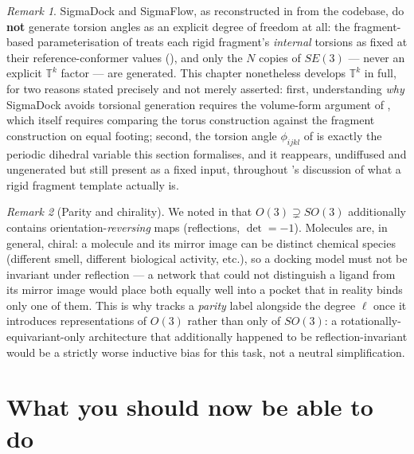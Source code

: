 \documentclass[11pt,a4paper]{report}
\theoremstyle{definition}
\theoremstyle{remark}
\newtheorem{remark}[remark]{Remark}
\begin{document}
\begin{remark}
\label{rem:torus-not-used}
SigmaDock and SigmaFlow, as reconstructed in
 from the codebase, do \textbf{not}
generate torsion angles as an explicit degree of freedom at all: the
fragment-based parameterisation of  treats
each rigid fragment's \emph{internal} torsions as fixed at their reference-conformer
values (), and only the $N$ copies of
$SE(3)$ --- never an explicit $\mathbb T^k$ factor --- are generated. This
chapter nonetheless develops $\mathbb T^k$ in full, for two reasons stated
precisely and not merely asserted: first, understanding \emph{why}
SigmaDock avoids torsional generation requires the volume-form argument of
, which itself requires comparing the torus
construction against the fragment construction on equal footing; second,
the torsion angle $\phi_{ijkl}$ of  is exactly the
periodic dihedral variable this section formalises, and it reappears,
undiffused and ungenerated but still present as a fixed input, throughout
's discussion of what a rigid fragment
template actually is.
\end{remark}

\begin{remark}[Parity and chirality]
\label{rem:parity-scratch}
We noted in  that $O(3)\supsetneq SO(3)$ additionally
contains orientation-\emph{reversing} maps (reflections, $\det=-1$).
Molecules are, in general, chiral: a molecule and its mirror image can be
distinct chemical species (different smell, different biological activity,
etc.), so a docking model must not be invariant under reflection --- a
network that could not distinguish a ligand from its mirror image would
place both equally well into a pocket that in reality binds only one of
them. This is why  tracks a \emph{parity} label
alongside the degree $\ell$ once it introduces representations of $O(3)$
rather than only of $SO(3)$: a rotationally-equivariant-only architecture
that additionally happened to be reflection-invariant would be a strictly
worse inductive bias for this task, not a neutral simplification.
\end{remark}


\section{What you should now be able to do}
\end{document}
